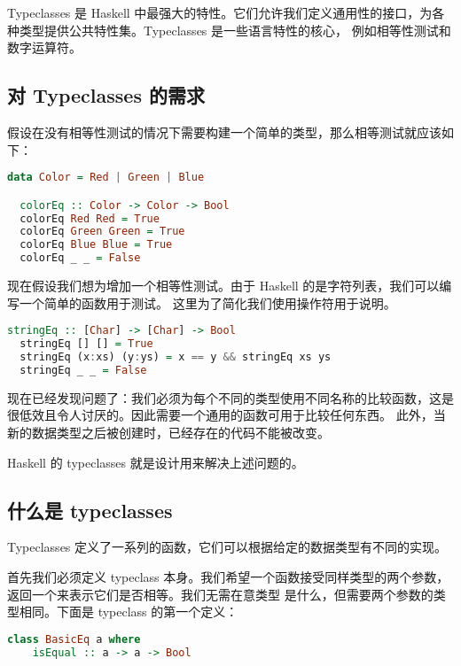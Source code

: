 \documentclass[./main.tex]{subfiles}
\begin{document}
Typeclasses 是 Haskell 中最强大的特性。它们允许我们定义通用性的接口，为各种类型提供公共特性集。Typeclasses 是一些语言特性的核心，
例如相等性测试和数字运算符。

\subsection*{对 Typeclasses 的需求}

假设在没有相等性测试\acode{==}的情况下需要构建一个简单的类型，那么相等测试就应该如下：

\begin{lstlisting}[language=Haskell]
  data Color = Red | Green | Blue

  colorEq :: Color -> Color -> Bool
  colorEq Red Red = True
  colorEq Green Green = True
  colorEq Blue Blue = True
  colorEq _ _ = False
\end{lstlisting}

现在假设我们想为增加一个相等性测试。由于 Haskell 的是字符列表，我们可以编写一个简单的函数用于测试。
这里为了简化我们使用\acode{==}操作符用于说明。

\begin{lstlisting}[language=Haskell]
  stringEq :: [Char] -> [Char] -> Bool
  stringEq [] [] = True
  stringEq (x:xs) (y:ys) = x == y && stringEq xs ys
  stringEq _ _ = False
\end{lstlisting}

现在已经发现问题了：我们必须为每个不同的类型使用不同名称的比较函数，这是很低效且令人讨厌的。因此需要一个通用的函数可用于比较任何东西。
此外，当新的数据类型之后被创建时，已经存在的代码不能被改变。

Haskell 的 typeclasses 就是设计用来解决上述问题的。

\subsection*{什么是 typeclasses}

Typeclasses 定义了一系列的函数，它们可以根据给定的数据类型有不同的实现。

首先我们必须定义 typeclass 本身。我们希望一个函数接受同样类型的两个参数，返回一个来表示它们是否相等。我们无需在意类型
是什么，但需要两个参数的类型相同。下面是 typeclass 的第一个定义：

\begin{lstlisting}[language=Haskell]
  class BasicEq a where
    isEqual :: a -> a -> Bool
\end{lstlisting}
\end{document}
